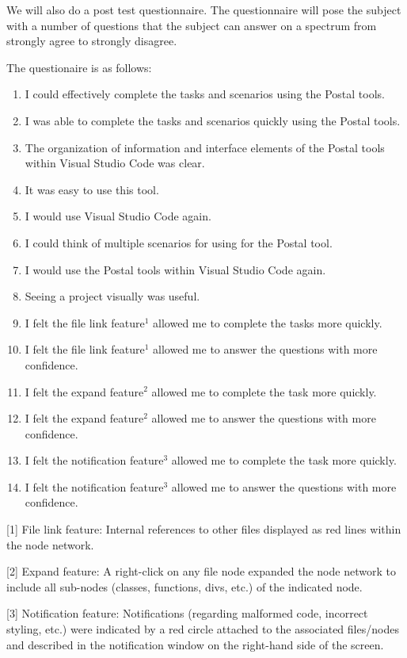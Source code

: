 \documentclass[letterpaper,10pt,titlepage,draftclsnofoot,onecolumn,onesided] {IEEEtran}
\begin{document}
	We will also do a post test questionnaire. 
	The questionnaire will pose the subject with a number of questions that the subject can answer on a spectrum from strongly agree to strongly disagree.

	The questionaire is as follows: 
	
	\begin{enumerate}
		\item I could effectively complete the tasks and scenarios using the Postal tools.
		\item I was able to complete the tasks and scenarios quickly using the Postal tools.
		\item The organization of information and interface elements of the Postal tools within Visual Studio Code was clear.
		\item It was easy to use this tool.
		\item I would use Visual Studio Code again.
		\item I could think of multiple scenarios for using for the Postal tool. 
		\item I would use the Postal tools within Visual Studio Code again.
		\item Seeing a project visually was useful. 
		\item I felt the file link feature$^1$ allowed me to complete the tasks more quickly.
		\item I felt the file link feature$^1$ allowed me to answer the questions with more confidence.
		\item I felt the expand feature$^2$ allowed me to complete the task more quickly.
		\item I felt the expand feature$^2$ allowed me to answer the questions with more confidence.
		\item I felt the notification feature$^3$ allowed me to complete the task more quickly.
		\item I felt the notification feature$^3$ allowed me to answer the questions with more confidence.	
	\end{enumerate}

	[1] File link feature: Internal references to other files displayed as red lines within the node network.

	[2] Expand feature: A right-click on any file node expanded the node network to include all sub-nodes (classes, functions, divs, etc.) of the indicated node.

	[3] Notification feature: Notifications (regarding malformed code, incorrect styling, etc.) were indicated by a red circle attached to the associated files/nodes and described in the notification window on the right-hand side of the screen.
\end{document}

